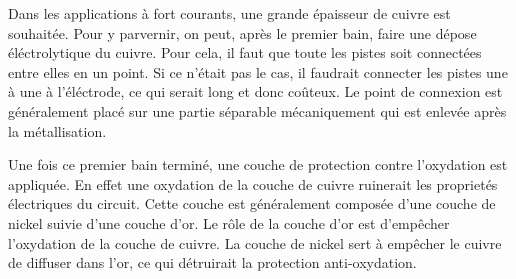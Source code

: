 Dans les applications à fort courants, une grande épaisseur de cuivre est
souhaitée. Pour y parvernir, on peut, après le premier bain, faire une dépose
éléctrolytique du cuivre. Pour cela, il faut que toute les pistes soit
connectées entre elles en un point. Si ce n'était pas le cas, il faudrait
connecter les pistes une à une à l'éléctrode, ce qui serait long et donc
coûteux. Le point de connexion est généralement placé sur une partie séparable
mécaniquement qui est enlevée après la métallisation.

Une fois ce premier bain terminé, une couche de protection contre l'oxydation
est appliquée. En effet une oxydation de la couche de cuivre ruinerait les
proprietés électriques du circuit.
Cette couche est généralement composée d'une couche de nickel
suivie d'une couche d'or. Le rôle de la couche d'or est d'empêcher l'oxydation
de la couche de cuivre. La couche de nickel sert à empêcher le cuivre de
diffuser dans l'or, ce qui détruirait la protection anti-oxydation.
